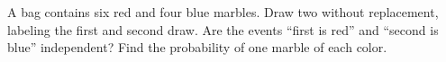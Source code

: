 A bag contains six red and four blue marbles. Draw two without replacement, labeling the first and second draw. Are the events ``first is red'' and ``second is blue'' independent? Find the probability of one marble of each color.
